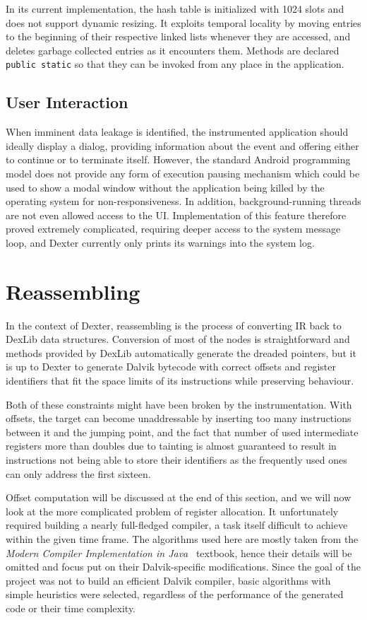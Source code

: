 \documentclass[12pt,twoside,notitlepage]{report}
\begin{document}
In its current implementation, the hash table is initialized with 1024 slots and does not support dynamic resizing. It exploits temporal locality by moving entries to the beginning of their respective linked lists whenever they are accessed, and deletes garbage collected entries as it encounters them. Methods are declared \verb$public static$ so that they can be invoked from any place in the application.

\subsection{User Interaction}

When imminent data leakage is identified, the instrumented application should ideally display a dialog, providing information about the event and offering either to continue or to terminate itself. However, the standard Android programming model does not provide any form of execution pausing mechanism which could be used to show a modal window without the application being killed by the operating system for non-responsiveness. In addition, background-running threads are not even allowed access to the UI. Implementation of this feature therefore proved extremely complicated, requiring deeper access to the system message loop, and Dexter currently only prints its warnings into the system log.

\section{Reassembling}

In the context of Dexter, reassembling is the process of converting IR back to DexLib data structures. Conversion of most of the nodes is straightforward and methods provided by DexLib automatically generate the dreaded pointers, but it is up to Dexter to generate Dalvik bytecode with correct offsets and register identifiers that fit the space limits of its instructions while preserving behaviour. 

Both of these constraints might have been broken by the instrumentation. With offsets, the target can become unaddressable by inserting too many instructions between it and the jumping point, and the fact that number of used intermediate registers more than doubles due to tainting is almost guaranteed to result in instructions not being able to store their identifiers as the frequently used ones can only address the first sixteen.

Offset computation will be discussed at the end of this section, and we will now look at the more complicated problem of register allocation. It unfortunately required building a nearly full-fledged compiler, a task itself difficult to achieve within the given time frame. The algorithms used here are mostly taken from the \emph{Modern Compiler Implementation in Java}~\cite{Appel:2003:MCI:599718} textbook, hence their details will be omitted and focus put on their Dalvik-specific modifications. Since the goal of the project was not to build an efficient Dalvik compiler, basic algorithms with simple heuristics were selected, regardless of the performance of the generated code or their time complexity.
\end{document}
